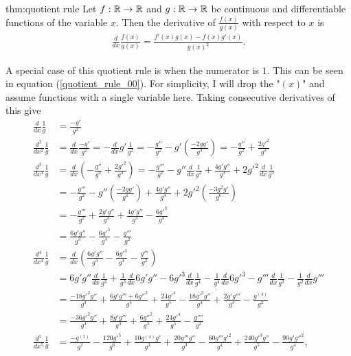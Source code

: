 \begin{theo}{thm:quotient rule}
	Let $f:{\mathbb R} \to {\mathbb R}$ and $g: {\mathbb R}\to{\mathbb R}$ be continuous and differentiable functions of the variable $x$. Then the derivative of $\frac{f(x)}{g(x)}$ with respect to $x$ is
	\begin{align}
		\frac{d}{dx} \frac{f(x)}{g(x)} = \frac{f'(x)g(x)-f(x)g'(x)}{g(x)^2}.
	\end{align}
\end{theo}
A special case of this quotient rule is when the numerator is $1$. This can be seen in equation (\ref{quotient_rule_00}). For simplicity, I will drop the "$(x)$" and assume functions with a single variable here. Taking consecutive derivatives of this give
\begin{align}
	\frac{d}{dx}\frac{1}{g} &= \frac{-g'}{g^2} \label{d/dx 1/g 1}\\
	\frac{d^2}{dx^2}\frac{1}{g} &= \frac{d}{dx}\frac{-g'}{g^2} = -\frac{d}{dx}g'\frac{1}{g^2} = -\frac{g''}{g^2}-g'\left(\frac{-2gg'}{g^4}\right) = -\frac{g''}{g^2}+\frac{2g'^2}{g^3} \label{d/dx 1/g 2}\\
	\frac{d^3}{dx^3}\frac{1}{g} &= \frac{d}{dx}\left(-\frac{g''}{g^2}+\frac{2g'^2}{g^3}\right) =- \frac{g'''}{g^2} - g''\frac{d}{dx}\frac{1}{g^2} +  \frac{4g'g''}{g^3} + 2g'^2\frac{d}{dx}\frac{1}{g^3}  \nonumber \\&= -\frac{g'''}{g^2}-g''\left(\frac{-2gg'}{g^4}\right)+\frac{4g'g''}{g^3}+2g'^2\left(\frac{-3g^2g'}{g^6}\right) \nonumber\\
	&= -\frac{g'''}{g^2}+\frac{2g'g''}{g^3}+\frac{4g'g''}{g^3}-\frac{6g'^3}{g^4} \nonumber\\
	&=\frac{6g'g''}{g^3}-\frac{6g'^3}{g^4}-\frac{g'''}{g^2} \label{d/dx 1/g 3}\\
	\frac{d^4}{dx^4}\frac{1}{g} &= \frac{d}{dx}\left(\frac{6g'g''}{g^3}-\frac{6g'^3}{g^4}-\frac{g'''}{g^2}\right) \nonumber \\
	&= 6g'g''\frac{d}{dx}\frac{1}{g^3}+\frac{1}{g^3}\frac{d}{dx}6g'g''-6g'^3\frac{d}{dx}\frac{1}{g^4}-\frac{1}{g^4}\frac{d}{dx}6g'^3-g'''\frac{d}{dx}\frac{1}{g^2}-\frac{1}{g^2}\frac{d}{dx}g'''\nonumber \\
	&= \frac{-18g'^2g''}{g^4}+\frac{6g'g'''+6g''^2}{g^3}+\frac{24g'^4}{g^5}-\frac{18g'^2g''}{g^4}+\frac{2g'g'''}{g^3}-\frac{g^{(4)}}{g^2}\nonumber \\
	&= \frac{-36g'^2g''}{g^4}+\frac{8g'g'''}{g^3}+\frac{6g''^2}{g^3}+\frac{24g'^4}{g^5}-\frac{g''''}{g^2} \label{d/dx 1/g 4}\\
	\frac{d^5}{dx^5}\frac{1}{g} &= \frac{-g^{(5)}}{g^2}-\frac{120g'^5}{g^6}+\frac{10g^{(4)}g'}{g^3}+\frac{20g'''g''}{g^3}-\frac{60g'''g'^2}{g^4}+\frac{240g'^3g''}{g^5}-\frac{90g'g''^2}{g^4},\label{d/dx 1/g 5}
\end{align}
